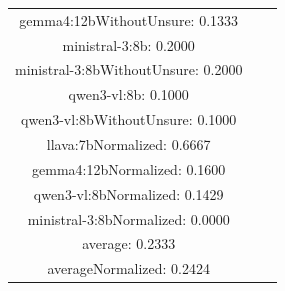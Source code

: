 \documentclass[a4paper]{article}
\begin{document}
\begin{tabular}{ccc}
gemma4:12bWithoutUnsure: 0.1333 \\ ministral-3:8b: 0.2000 \\ ministral-3:8bWithoutUnsure: 0.2000 \\ qwen3-vl:8b: 0.1000 \\ qwen3-vl:8bWithoutUnsure: 0.1000 \\ llava:7bNormalized: 0.6667 \\ gemma4:12bNormalized: 0.1600 \\ qwen3-vl:8bNormalized: 0.1429 \\ ministral-3:8bNormalized: 0.0000 \\ average: 0.2333 \\ averageNormalized: 0.2424 \end{minipage}\\
\end{tabular}

\vspace{5mm}
\end{document}
